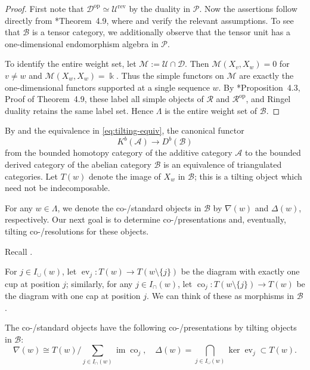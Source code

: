 \documentclass[11pt,oneside]{amsart}
\theoremstyle{definition}
\theoremstyle{remark}
\newcommand\kk{\Bbbk}
\newcommand\cA{\mathcal A}
\newcommand\cB{\mathcal B}
\newcommand\cD{\mathcal D}
\newcommand\cM{\mathcal M}
\newcommand\cP{\mathcal P}
\newcommand\cR{\mathcal R}
\newcommand\cU{\mathcal U}
\newcommand\ev{\operatorname{ev}}
\newcommand\co{\operatorname{co}}
\newcommand\im{\operatorname{im}}
\renewcommand\:\colon
\newcommand\op{^{\mathrm{op}}}
\begin{document}
\begin{proof} First note that $\cD\op\simeq\cU^{\text{rev}}$ by the duality in $\cP$. Now the assertions follow directly from \cite{FG}*{Theorem~4.9}, where  and  verify the relevant assumptions. To see that $\cB$ is a tensor category, we additionally observe that the tensor unit has a one-dimensional endomorphism algebra in $\cP$.

To identify the entire weight set, let $\cM:=\cU\cap\cD$. Then $\cM(X_v,X_w)=0$ for $v\ne w$ and $\cM(X_w,X_w)=\kk$. Thus the simple functors on $\cM$ are exactly the one-dimensional functors supported at a single sequence $w$. By \cite{FG}*{Proposition~4.3, Proof of Theorem~4.9}, these label all simple objects of $\cR$ and $\cR\op$, and Ringel duality retains the same label set. Hence $\Lambda$ is the entire weight set of $\cB$.
\end{proof}

\medskip

By  and the equivalence in \eqref{eq:tilting-equiv}, the canonical functor 
\[
K^b(\cA) \longrightarrow D^b(\cB)
\]
from the bounded homotopy category of the additive category $\cA$ to the bounded derived category of the abelian category $\cB$
is an equivalence of triangulated categories.
Let $T(w)$ denote the image of $X_w$ in $\cB$; this is a tilting object which need not be indecomposable.

\medskip

For any $w\in\Lambda$, we denote the co-/standard objects in $\cB$ by $\nabla(w)$ and $\Delta(w)$, respectively. Our next goal is to determine co-/presentations and, eventually, tilting co-/resolutions for these 
objects.


Recall .

For $j\in I_\cup(w)$, let $\ev_j\:T(w)\to T(w\setminus\{j\})$ be the diagram with exactly one cup at position $j$; similarly, for any $j\in I_\cap(w)$, let $\co_j\: T(w\setminus\{j\})\to T(w)$ be the diagram with one cap at position $j$. We can think of these as morphisms in $\cB$.

\begin{lemma} \label{lem:presentations} The co-/standard objects have the following co-/presentations by tilting objects in $\cB$:
$$
\nabla(w) \cong T(w) \big/  \sum_{j\in I_\cap(w)} \im \co_j ,\quad
\Delta(w) = \bigcap_{j\in I_\cup(w)} \ker \ev_j \subset T(w) .
$$
\end{lemma}
\end{document}
